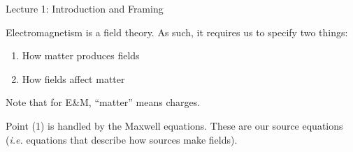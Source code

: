 \documentclass{article}
\begin{document}
\begin{center}
    {\Huge Lecture 1: Introduction and Framing} \\[0.5cm]
\end{center}

\vspace{1em}

Electromagnetism is a field theory. As such, it requires us to specify two things:

\begin{enumerate}

\item[(1)] How matter produces fields

\item[(2)] How fields affect matter

\end{enumerate}

Note that for E\&M, ``matter'' means charges.

\vspace{1em}

Point (1) is handled by the Maxwell equations. These are our source equations (\emph{i.e.} equations that describe how sources make fields).
\end{document}
